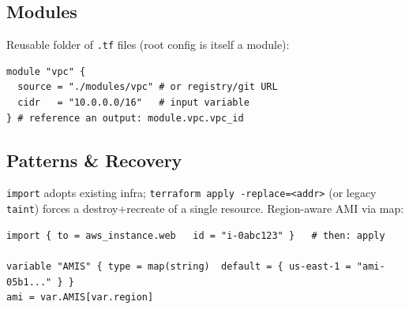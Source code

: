 \subsection{Modules}
Reusable folder of \texttt{.tf} files (root config is itself a module):
\begin{lstlisting}[language=hcl]
module "vpc" {
  source = "./modules/vpc" # or registry/git URL
  cidr   = "10.0.0.0/16"   # input variable
} # reference an output: module.vpc.vpc_id
\end{lstlisting}
\subsection{Patterns \& Recovery}
\texttt{import} adopts existing infra; \texttt{terraform apply -replace=<addr>} (or legacy \texttt{taint}) forces a destroy+recreate of a single resource. Region-aware AMI via map:
\begin{lstlisting}[language=hcl]
import { to = aws_instance.web   id = "i-0abc123" }   # then: apply

variable "AMIS" { type = map(string)  default = { us-east-1 = "ami-05b1..." } }
ami = var.AMIS[var.region]
\end{lstlisting}
